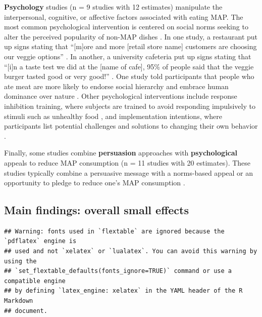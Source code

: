 \documentclass[preprint, 3p,
authoryear]{elsarticle} %
\begin{document}
\textbf{Psychology} studies
\citep{aldoh2023, allen2002, camp2019, coker2022, piester2020, sparkman2020}
(n = 9 studies with 12 estimates) manipulate the interpersonal,
cognitive, or affective factors associated with eating MAP. The most
common psychological intervention is centered on social norms seeking to
alter the perceived popularity of non-MAP dishes
\citep{sparkman2020, sparkman2021}. In one study, a restaurant put up
signs stating that ``{[}m{]}ore and more {[}retail store name{]}
customers are choosing our veggie options'' \citep{coker2022}. In
another, a university cafeteria put up signs stating that ``{[}i{]}n a
taste test we did at the {[}name of cafe{]}, 95\% of people said that
the veggie burger tasted good or very good!'' \citep{piester2020}. One
study told participants that people who ate meat are more likely to
endorse social hierarchy and embrace human dominance over nature
\citep{allen2002}. Other psychological interventions include response
inhibition training, where subjects are trained to avoid responding
impulsively to stimuli such as unhealthy food \citep{camp2019}, and
implementation intentions, where participants list potential challenges
and solutions to changing their own behavior
\citep{aberman2018, shreedhar2021}.

Finally, some studies combine \textbf{persuasion} approaches with
\textbf{psychological} appeals to reduce MAP consumption
\citep{aberman2018, berndsen2005, bertolaso2015, carfora2023, fehrenbach2015, hennessy2016, mathur2021effectiveness, mattson2020, piester2020, shreedhar2021}
(n = 11 studies with 20 estimates). These studies typically combine a
persuasive message with a norms-based appeal
\citep{piester2020, mattson2020} or an opportunity to pledge to reduce
one's MAP consumption \citep{mathur2021effectiveness, shreedhar2021}.

\subsection{Main findings: overall small effects}\label{Sec3.2}

\begin{verbatim}
## Warning: fonts used in `flextable` are ignored because the `pdflatex` engine is
## used and not `xelatex` or `lualatex`. You can avoid this warning by using the
## `set_flextable_defaults(fonts_ignore=TRUE)` command or use a compatible engine
## by defining `latex_engine: xelatex` in the YAML header of the R Markdown
## document.
\end{verbatim}
\end{document}

